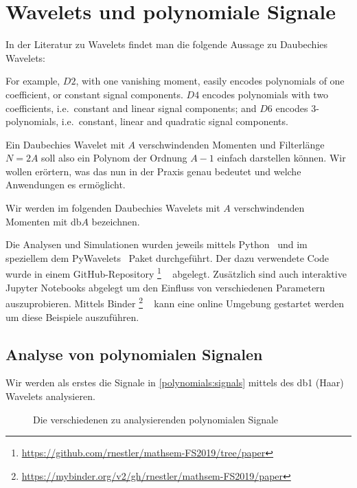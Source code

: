 %
%
%
\chapter{Wavelets und polynomiale Signale\label{chapter:thema}}
\begin{refsection}

In der Literatur zu Wavelets findet man die folgende Aussage zu Daubechies
Wavelets:
\begin{displayquote}
For example, $D2$, with one vanishing moment, easily encodes polynomials of one
coefficient, or constant signal components. $D4$ encodes polynomials with two
coefficients, i.e.\ constant and linear signal components; and $D6$ encodes
3-polynomials, i.e.\ constant, linear and quadratic signal components.
\end{displayquote}
Ein Daubechies Wavelet mit $A$ verschwindenden Momenten und Filterlänge $N=2A$
soll also ein Polynom der Ordnung $A-1$ einfach darstellen können. Wir wollen
erörtern, was das nun in der Praxis genau bedeutet und welche Anwendungen es
ermöglicht.

Wir werden im folgenden Daubechies Wavelets mit $A$ verschwindenden Momenten mit
db$A$ bezeichnen.

Die Analysen und Simulationen wurden jeweils mittels Python~\cite{python} und im
speziellem dem PyWavelets~\cite{gregory_r_lee_2019_2634243} Paket durchgeführt.
Der dazu verwendete Code wurde in einem GitHub-Repository%
\footnote{\url{https://github.com/rnestler/mathsem-FS2019/tree/paper}}%
~\cite{polynomials:repo}
abgelegt. Zusätzlich sind auch interaktive Jupyter Notebooks abgelegt um den
Einfluss von verschiedenen Parametern auszuprobieren. Mittels
Binder%
\footnote{\url{https://mybinder.org/v2/gh/rnestler/mathsem-FS2019/paper}}%
~\cite{project_jupyter-proc-scipy-2018}%
kann eine online Umgebung gestartet werden um diese Beispiele auszuführen.

\section{Analyse von polynomialen Signalen}

Wir werden als erstes die Signale in \autoref{polynomials:signals} mittels des db1
(Haar) Wavelets analysieren.

\begin{figure}
    \centering
    
    \caption{Die verschiedenen zu analysierenden polynomialen Signale\label{polynomials:signals}}
\end{figure}


\end{refsection}
